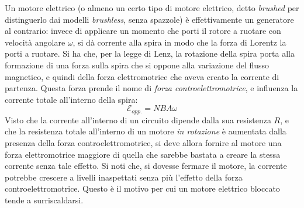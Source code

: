 \documentclass[a4paper,12pt]{article}
\begin{document}
Un motore elettrico (o almeno un certo tipo di motore elettrico, detto \textit{brushed} per distinguerlo dai modelli \textit{brushless}, senza spazzole)
è effettivamente un generatore al contrario: invece di applicare un momento che porti il rotore
a ruotare con velocità angolare $\omega$, si dà corrente alla spira in modo che la forza di Lorentz la porti a ruotare.
Si ha che, per la legge di Lenz, la rotazione della spira porta alla formazione di una forza sulla spira che si oppone
alla variazione del flusso magnetico, e quindi della forza elettromotrice che aveva creato la corrente di partenza. Questa
forza prende il nome di \textit{forza controelettromotrice}, e influenza la corrente totale all'interno della spira:
$$ \mathcal{E}_{opp.} = NBA\omega $$
Visto che la corrente all'interno di un circuito dipende dalla sua resistenza $R$, e che la resistenza totale all'interno di un motore
\textit{in rotazione} è aumentata dalla presenza della forza controelettromotrice, si deve allora fornire al motore una forza elettromotrice
maggiore di quella che sarebbe bastata a creare la stessa corrente senza tale effetto.
Si noti che, si dovesse fermare il motore, la corrente potrebbe crescere a livelli inaspettati senza più l'effetto della forza controelettromotrice.
Questo è il motivo per cui un motore elettrico bloccato tende a surriscaldarsi.
\end{document}
